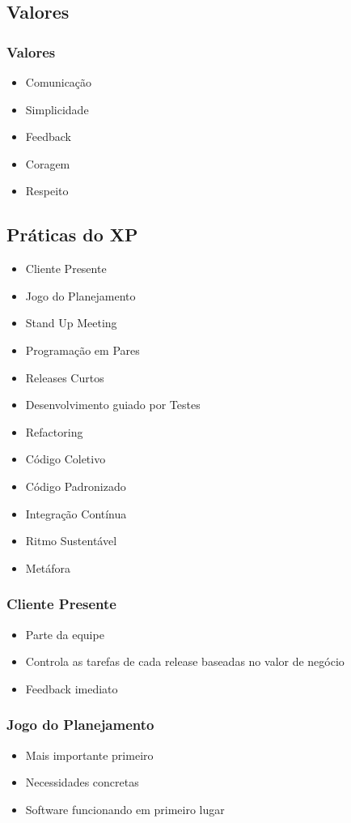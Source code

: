 \documentclass[10pt]{beamer}
\begin{document}
\subsection{Valores}
\begin{frame}
  \frametitle{Valores}
  \begin{itemize}
  \item Comunicação
  \item Simplicidade
  \item Feedback
  \item Coragem
  \item Respeito
  \end{itemize}
\end{frame}

\subsection{Práticas do XP}
\begin{frame}
  \begin{itemize}
  \item Cliente Presente
  \item Jogo do Planejamento
  \item Stand Up Meeting
  \item Programação em Pares
  \item Releases Curtos
  \item Desenvolvimento guiado por Testes
  \item Refactoring
  \item Código Coletivo
  \item Código Padronizado
  \item Integração Contínua
  \item Ritmo Sustentável
  \item Metáfora
  \end{itemize}
\end{frame}

\begin{frame}
  \frametitle{Cliente Presente}
  \begin{itemize}
  \item Parte da equipe
  \item Controla as tarefas de cada release baseadas no valor de negócio
  \item Feedback imediato
  \end{itemize}
\end{frame}

\begin{frame}
  \frametitle{Jogo do Planejamento}
  \begin{itemize}
  \item Mais importante primeiro
  \item Necessidades concretas
  \item Software funcionando em primeiro lugar
  \end{itemize}
\end{frame}
\end{document}
